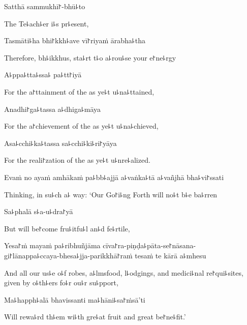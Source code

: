 Satthā sammukhī꜓-bhū꜕to

\begin{english}
  The Te꜕ach꜕er i꜕s pr꜕esent,
\end{english}

Tasmāti꜕ha bhi꜓kkh꜕ave vī꜓riyaṁ ārabha꜕tha

\begin{english}
  Therefore, bh꜕ikkhus, sta꜕rt t꜕o a꜕rou꜕se your e꜓ne꜕rgy
\end{english}

A꜕ppa꜕tta꜕ssa꜕ pa꜕tt꜓iyā

\begin{english}
  For the a꜓ttainment of the as ye꜕t u꜕na꜕ttained,
\end{english}

\ifaivedition
\clearpage
\fi

Anadhi꜓ga꜕tassa a꜕dhiga꜕māya

\begin{english}
  For the a꜓chievement of the as ye꜕t u꜕na꜕chieved,
\end{english}

Asa꜕cchi꜕ka꜕tassa sa꜕cchi꜕ki꜕ri꜓yāya

\begin{english}
  For the reali꜓zation of the as ye꜕t u꜕nre꜕alized.
\end{english}

Evaṁ no ayaṁ amhākaṁ pa꜕bb꜕ajjā a꜕vaṅka꜕tā a꜕vañjhā bha꜕vi꜓ssati

\begin{english}
  Thinking, in su꜕ch a꜕ way: `Our Go꜓i꜕ng Forth will no꜕t b꜕e ba꜕rren
\end{english}

Sa꜕phalā s꜕a-u꜕dra꜓yā

\begin{english}
  But will be꜓come fru꜕itfu꜕l an꜕d fe꜕rtile,
\end{english}

Yesa꜓ṁ mayaṁ pa꜕ribhuñjāma cīva꜓ra-piṇḍa꜕pāta-se꜓nāsana-\\
gi꜓lānappa꜕ccaya-bhesa꜕jja-parikkhā꜓raṁ tesaṁ te kārā a꜕mhesu

\begin{english}
  And all our us꜕e o꜕f robes, a꜕lmsfood, l꜕odgings, and medici꜕nal
  re꜓qui꜕sites, given by o꜕th꜕ers fo꜕r ou꜕r su꜕pport,
\end{english}

Ma꜕happh꜕alā bhavissanti ma꜕hāni꜕sa꜓ṁsā'ti

\begin{english}
  Will rewa꜕rd th꜕em wi꜕th gre꜕at fruit and great be꜓ne꜕fit.'
\end{english}

